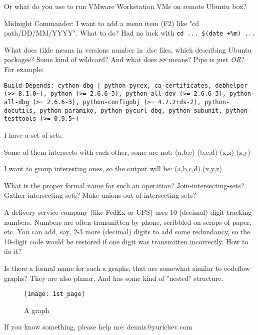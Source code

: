 Or what do you use to run VMware Workstation VMs on remote Ubuntu box?

\myhrule{}

Midnight Commander: I want to add a menu item (F2) like "cd path/DD/MM/YYYY".
What to do?
Had no luck with \verb|cd ... $(date +%m) ...|

\myhrule{}

What does tilde means in versions number in .dsc files, which describing Ubuntu packages?
Some kind of wildcard?
And what does \verb|>>| means?
Pipe is just \emph{OR}?
For example:

\begin{lstlisting}
Build-Depends: cython-dbg | python-pyrex, ca-certificates, debhelper (>> 8.1.0~), python (>= 2.6.6-3), python-all-dev (>= 2.6.6-3), python-all-dbg (>= 2.6.6-3), python-configobj (>= 4.7.2+ds-2), python-docutils, python-paramiko, python-pycurl-dbg, python-subunit, python-testtools (>= 0.9.5~)
\end{lstlisting}

\myhrule{}

I have a set of sets.

Some of them intersects with each other, some are not: (a,b,c) (b,c,d) (x,z) (z,y)

I want to group interesting ones, so the output will be: (a,b,c,d) (x,y,z)

What is the proper formal name for such an operation?
Join-intersecting-sets?
Gather-intersecting-sets?
Make-unions-out-of-intersecting-sets?

\myhrule{}

A delivery service company (like FedEx or UPS) uses 10 (decimal) digit tracking numbers.
Numbers are often transmitten by phone, scribbled on scraps of paper, etc.
You can add, say, 2-3 more (decimal) digits to add some redundancy, so the 10-digit code would be restored
if one digit was transmitten incorrectly.
How to do it?

\myhrule{}

Is there a formal name for such a graphs, that are somewhat similar to codeflow graphs?
They are also planar.
And has some kind of "nested" structure.

\begin{figure}[H]
\centering
\texttt{[image: 1st\_page]}
\caption{A graph}
\end{figure}

\myhrule{}

If you know something, please help me: dennis@yurichev.com

